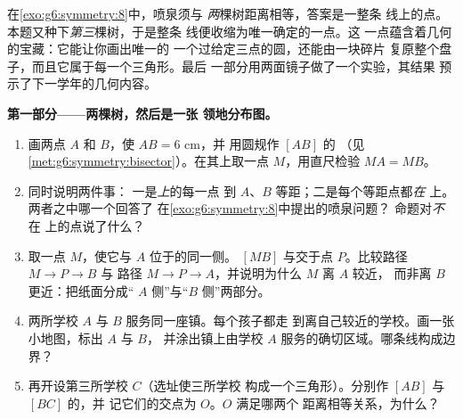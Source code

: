 \begin{problem}
\label{pb:g6:symmetry:1}
在\cref{exo:g6:symmetry:8}中，喷泉须与
\emph{两}棵树距离相等，答案是一整条
线上的点。本题又种下\emph{第三}棵树，于是整条
线便收缩为唯一确定的一点。这
一点蕴含着几何的宝藏：它能让你画出唯一的
一个过给定三点的圆，还能由一块碎片
复原整个盘子，而且它属于每一个三角形。最后
一部分用两面镜子做了一个实验，其结果
预示了下一学年的几何内容。

\medskip
\noindent\textbf{第一部分——两棵树，然后是一张
领地分布图。}
\begin{enumerate}
  \item 画两点 $A$ 和 $B$，使 $AB = 6$ cm，并
        用圆规作 $[AB]$ 的
        （见\cref{met:g6:symmetry:bisector}）。在其上取一点
        $M$，用直尺检验 $MA = MB$。
  \item {}同时说明两件事：
        一是\emph{上}的每一点
        到 $A$、$B$ 等距；二是每个等距点都\emph{在}
        上。两者之中哪一个回答了
        在\cref{exo:g6:symmetry:8}中提出的喷泉问题？
        命题对\emph{不}在
        上的点说了什么？
  \item 取一点 $M$，使它与
        $A$ 位于的同一侧。 $[MB]$ 与交于点
        $P$。比较路径 $M \to P \to B$ 与
        路径 $M \to P \to A$，并说明为什么 $M$ 离 $A$ 较近，
        而非离 $B$ 更近：把纸面分成“
        $A$ 侧”与“$B$ 侧”两部分。
  \item 两所学校 $A$ 与 $B$ 服务同一座镇。每个孩子都走
        到离自己较近的学校。画一张小地图，标出 $A$ 与 $B$，
        并涂出镇上由学校
        $A$ 服务的确切区域。哪条线构成边界？
  \item 再开设第三所学校 $C$（选址使三所学校
        构成一个三角形）。分别作
        $[AB]$ 与 $[BC]$ 的，并
        记它们的交点为 $O$。$O$ 满足哪两个
        距离相等关系，为什么？
\end{enumerate}


\end{problem}

